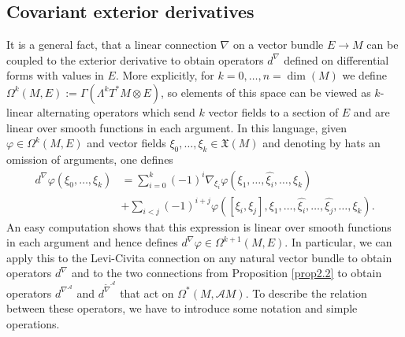 \documentclass[12pt,a4paper]{amsart}
\def\frak{\mathfrak}
\def\Cal{\mathcal}
\let\phi\varphi
\newcommand{\ph}{\phi}
\newcommand{\Ga}{\Gamma}
\newcommand{\La}{\Lambda}
\newcommand{\Om}{\Omega}
\newcommand{\tn}{\widetilde{\nabla}}
\numberwithin{theorem}{section}
\numberwithin{equation}{section}
\theoremstyle{definition}
\theoremstyle{remark}
\begin{document}
\subsection{Covariant exterior derivatives}\label{2.3}
It is a general fact, that a linear connection $\nabla$ on a vector bundle $E\to M$
can be coupled to the exterior derivative to obtain operators $d^{\nabla}$ defined on
differential forms with values in $E$. More explicitly, for $k=0,\dots,n=\dim(M)$ we
define $\Om^k(M,E):=\Ga(\La^kT^*M\otimes E)$, so elements of this space can be viewed
as $k$-linear alternating operators which send $k$ vector fields to a section of $E$
and are linear over smooth functions in each argument. In this language, given
$\ph\in\Om^k(M,E)$ and vector fields $\xi_0,\dots,\xi_k\in\frak X(M)$ and denoting by
hats an omission of arguments, one defines
\begin{equation}\label{dn-def}
  \begin{aligned}
    d^{\nabla}\ph(\xi_0,\dots,\xi_k)&=\textstyle\sum_{i=0}^k(-1)^i\nabla_{\xi_i}
    \ph(\xi_1,\dots,\widehat{\xi_i},\dots,\xi_k)\\ &+
  \textstyle\sum_{i<j}(-1)^{i+j}\ph([\xi_i,\xi_j],\xi_1,
  \dots,\widehat{\xi_i},\dots,\widehat{\xi_j},\dots,\xi_k).
  \end{aligned}
\end{equation}
An easy computation shows that this expression is linear over smooth functions in
each argument and hence defines $d^{\nabla}\ph\in\Om^{k+1}(M,E)$. In particular, we
can apply this to the Levi-Civita connection on any natural vector bundle to obtain
operators $d^{\nabla}$ and to the two connections from Proposition \ref{prop2.2} to
obtain operators $d^{\nabla^{\Cal A}}$ and $d^{\tn^{\Cal A}}$ that act on
$\Om^*(M,\Cal AM)$. To describe the relation between these operators, we have to
introduce some notation and simple operations.
\end{document}
